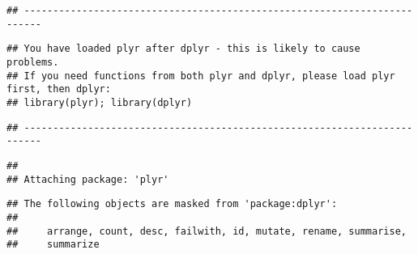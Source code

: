 \documentclass[]{article}
\newenvironment{Shaded}{\begin{snugshade}}{\end{snugshade}}
\newcommand{\KeywordTok}[1]{\textcolor[rgb]{0.13,0.29,0.53}{\textbf{#1}}}
\newcommand{\DataTypeTok}[1]{\textcolor[rgb]{0.13,0.29,0.53}{#1}}
\newcommand{\DecValTok}[1]{\textcolor[rgb]{0.00,0.00,0.81}{#1}}
\newcommand{\StringTok}[1]{\textcolor[rgb]{0.31,0.60,0.02}{#1}}
\newcommand{\CommentTok}[1]{\textcolor[rgb]{0.56,0.35,0.01}{\textit{#1}}}
\newcommand{\ControlFlowTok}[1]{\textcolor[rgb]{0.13,0.29,0.53}{\textbf{#1}}}
\newcommand{\OperatorTok}[1]{\textcolor[rgb]{0.81,0.36,0.00}{\textbf{#1}}}
\newcommand{\NormalTok}[1]{#1}
\begin{document}
\begin{verbatim}
## -------------------------------------------------------------------------
\end{verbatim}

\begin{verbatim}
## You have loaded plyr after dplyr - this is likely to cause problems.
## If you need functions from both plyr and dplyr, please load plyr first, then dplyr:
## library(plyr); library(dplyr)
\end{verbatim}

\begin{verbatim}
## -------------------------------------------------------------------------
\end{verbatim}

\begin{verbatim}
## 
## Attaching package: 'plyr'
\end{verbatim}

\begin{verbatim}
## The following objects are masked from 'package:dplyr':
## 
##     arrange, count, desc, failwith, id, mutate, rename, summarise,
##     summarize
\end{verbatim}

\begin{Shaded}
\end{Shaded}
\end{document}
